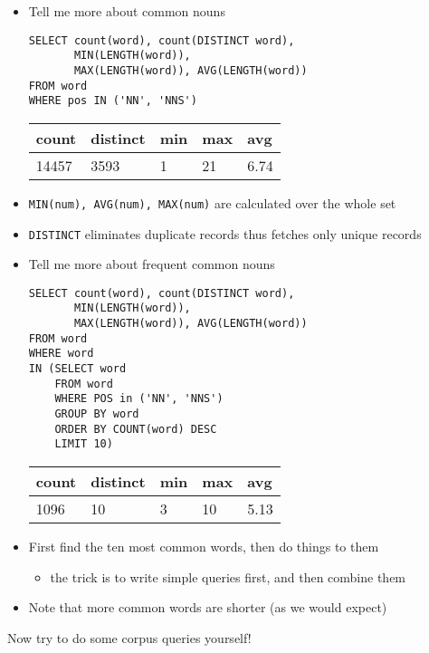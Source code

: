 \documentclass[a4paper,landscape,headrule,footrule,xetex]{foils}
\begin{document}

\begin{itemize}
\item Tell me more about common nouns
\begin{verbatim}
SELECT count(word), count(DISTINCT word),
       MIN(LENGTH(word)), 
       MAX(LENGTH(word)), AVG(LENGTH(word))
FROM word
WHERE pos IN ('NN', 'NNS')
\end{verbatim}
  \begin{tabular}{lllll}
    \textbf{count}  & \textbf{distinct} &\textbf{min}  &  \textbf{max} & \textbf{avg} \\ \hline
    14457 & 3593 & 1 & 21 & 6.74
  \end{tabular}
\item  \texttt{MIN(num), AVG(num), MAX(num)} are calculated over the whole set
\item \texttt{DISTINCT} eliminates duplicate records thus fetches only unique records
\end{itemize}


\begin{itemize}
\item Tell me more about frequent common nouns
\begin{verbatim}
SELECT count(word), count(DISTINCT word),
       MIN(LENGTH(word)), 
       MAX(LENGTH(word)), AVG(LENGTH(word))
FROM word
WHERE word 
IN (SELECT word
    FROM word
    WHERE POS in ('NN', 'NNS') 
    GROUP BY word
    ORDER BY COUNT(word) DESC
    LIMIT 10)

\end{verbatim}
  \begin{tabular}{lllll}
    \textbf{count}  & \textbf{distinct} &\textbf{min}  &  \textbf{max} & \textbf{avg} \\ \hline
    1096 & 10 & 3 & 10 & 5.13
  \end{tabular}
\item First find the ten most common words, then do things to them
  \begin{itemize}
  \item the trick is to write simple queries first, and then combine them
  \end{itemize}
\item Note that more common words are shorter (as we would expect)
\end{itemize}
\begin{center}
  Now try to do some corpus queries yourself!
\end{center}
\end{document}
